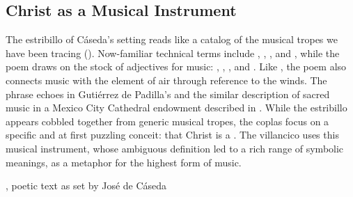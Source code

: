 
\subsection{Christ as a Musical Instrument}

The estribillo of Cáseda's setting reads like a catalog of the musical tropes
we have been tracing ().
Now-familiar technical terms include , ,
, and , while the poem draws on the stock
of adjectives for music: , ,
, and .
Like , the poem also connects music with the element of
air through reference to the winds.
The phrase  echoes  in Gutiérrez de Padilla's  and the
similar description of sacred music in a Mexico City Cathedral endowment
described in .
While the estribillo appears cobbled together from generic musical tropes, the
coplas focus on a specific and at first puzzling conceit: that Christ is a
.
The villancico uses this musical instrument, whose ambiguous definition led to
a rich range of symbolic meanings, as a metaphor for the highest form of music.


\begin{poemexample}
    \caption{, poetic text as set by José de Cáseda}
    \label{poem:Que_musica_divina}
\end{poemexample}


